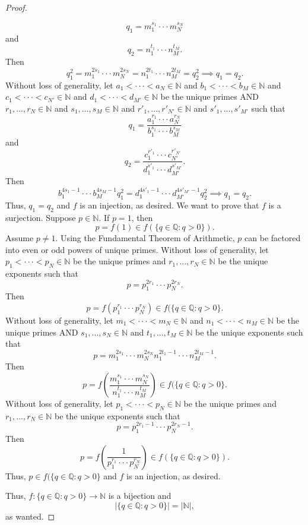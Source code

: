 \documentclass[12pt]{article}
\theoremstyle{definition}
\begin{document}
\begin{proof}
\begin{enumerate}[label=\alph*)]
        \[
            q_1 = m_1^{s_1} \cdot \cdot \cdot m_N^{s_N}
        \]
        and
        \[
            q_2 = n_1^{t_1} \cdot \cdot \cdot n_{M}^{t_M}.  
        \]
        Then
        \[
            q_1^2 = m_1^{2s_1} \cdot \cdot \cdot m_N^{2s_N} = n_1^{2t_1} \cdot \cdot \cdot n_{M}^{2t_M} = q_2^2 \implies q_1 = q_2.
        \]
        Without loss of generality, let $a_1 < \cdot \cdot \cdot < a_N \in \mathbb{N}$ and $b_1 < \cdot \cdot \cdot < b_M \in \mathbb{N}$ and $c_1 < \cdot \cdot \cdot < c_{N'} \in \mathbb{N}$ and $d_1 < \cdot \cdot \cdot < d_{M'} \in \mathbb{N}$ be the unique primes AND $r_1,...,r_N \in \mathbb{N}$ and $s_1,...,s_M \in \mathbb{N}$ and $r'_1,...,r'_{N'} \in \mathbb{N}$ and $s'_1,...,s'_{M'}$ such that
        \[
            q_1 = \frac{a_1^{r_1} \cdot \cdot \cdot a_N^{r_N}}{b_1^{s_1} \cdot \cdot \cdot b_M^{s_M}}
        \]
        and
        \[
            q_2 = \frac{c_1^{r'_1} \cdot \cdot \cdot c_{N'}^{r'_{N'}}}{d_1^{s'_1} \cdot \cdot \cdot d_{M'}^{s'_{M'}}}.
        \]
        Then
        \[
            b_1^{4s_1-1} \cdot \cdot \cdot b_M^{4s_M-1}q_1^2 = d_1^{4s'_1-1} \cdot \cdot \cdot d_{M'}^{4s'_{M'} - 1}q_2^2 \implies q_1 = q_2. 
        \]
        Thus, $q_1 = q_2$ and $f$ is an injection, as desired. We want to prove that $f$ is a surjection. Suppose $p \in \mathbb{N}$. If $p = 1$, then
        \[
            p = f(1) \in f(\{q \in \mathbb{Q} : q > 0\}).
        \]
        Assume $p \neq 1$. Using the Fundamental Theorem of Arithmetic, $p$ can be factored into even or odd powers of unique primes. Without loss of generality, let $p_1 < \cdot \cdot \cdot < p_N \in \mathbb{N}$ be the unique primes and $r_1,...,r_N \in \mathbb{N}$ be the unique exponents such that 
        \[
            p = p_1^{2r_1} \cdot \cdot \cdot p_N^{2r_N}.
        \]
        Then 
        \[
            p = f(p_1^{r_1} \cdot \cdot \cdot p_N^{r_N}) \in f(\{q \in \mathbb{Q} : q > 0\}.
        \]
        Without loss of generality, let $m_1 < \cdot \cdot \cdot < m_N \in \mathbb{N}$ and $n_1 < \cdot \cdot \cdot < n_M \in \mathbb{N}$ be the unique primes AND $s_1,...,s_N \in \mathbb{N}$ and $t_1,...,t_M \in \mathbb{N}$ be the unique exponents such that
        \[
            p = m_1^{2s_1} \cdot \cdot \cdot m_N^{2s_N}n_1^{2t_1-1} \cdot \cdot \cdot n_M^{2t_M-1}.
        \]
        Then
        \[
            p = f\left(\frac{m_1^{s_1} \cdot \cdot \cdot m_N^{s_N}}{n_1^{t_1} \cdot \cdot \cdot n_M^{t_M}}\right) \in f(\{q \in \mathbb{Q} : q > 0\}.
        \]
        Without loss of generality, let $p_1 < \cdot \cdot \cdot < p_N \in \mathbb{N}$ be the unique primes and $r_1,...,r_N \in \mathbb{N}$ be the unique exponents such that 
        \[
             p = p_1^{2r_1-1} \cdot \cdot \cdot p_N^{2r_N-1}.
        \]
        Then
        \[
            p = f\left(\frac{1}{p_1^{r_1} \cdot \cdot \cdot p_N^{r_N}}\right) \in f(\{q \in \mathbb{Q} : q > 0\}).
        \]
        Thus, $p \in f(\{q \in \mathbb{Q} : q > 0\}$ and $f$ is an injection, as desired. 
    \end{enumerate}
    Thus, $f : \{q \in \mathbb{Q} : q > 0\} \to \mathbb{N}$ is a bijection and
    \[
        \vert \{q \in \mathbb{Q} : q > 0\} \vert = \vert \mathbb{N} \vert,
    \]
    as wanted.
\end{proof}
\end{document}
